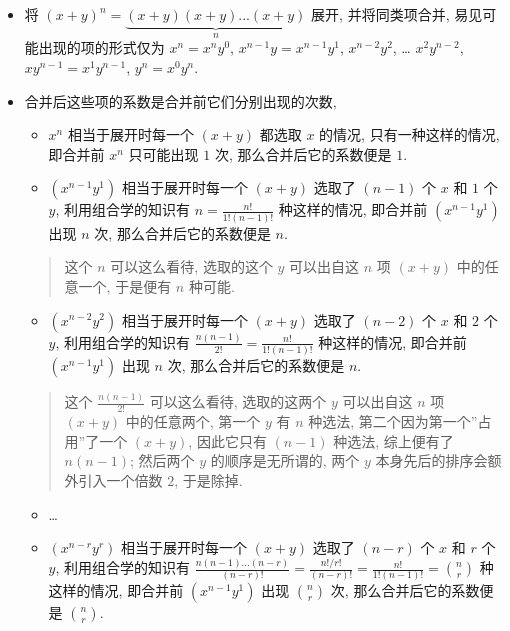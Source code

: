 \begin{itemize}
\item
  将 \((x+y)^n=\underbrace{(x+y)(x+y)...(x+y)}_{n}\) 展开,
  并将同类项合并, 易见可能出现的项的形式仅为 \(x^n=x^ny^0\),
  \(x^{n-1}y=x^{n-1}y^1\), \(x^{n-2}y^2\), \ldots{} \(x^2y^{n-2}\),
  \(xy^{n-1}=x^1y^{n-1}\), \(y^n=x^0y^n\).
\item
  合并后这些项的系数是合并前它们分别出现的次数,

  \begin{itemize}
  \tightlist
  \item
    \(x^n\) 相当于展开时每一个 \((x+y)\) 都选取 \(x\) 的情况,
    只有一种这样的情况, 即合并前 \(x^n\) 只可能出现 \(1\) 次,
    那么合并后它的系数便是 \(1\).
  \item
    \((x^{n-1}y^1)\) 相当于展开时每一个 \((x+y)\) 选取了 \((n-1)\) 个
    \(x\) 和 \(1\) 个 \(y\), 利用组合学的知识有
    \(n=\frac{n!}{1!(n-1)!}\) 种这样的情况, 即合并前 \((x^{n-1}y^1)\)
    出现 \(n\) 次, 那么合并后它的系数便是 \(n\).
  \end{itemize}

  \begin{quote}
  这个 \(n\) 可以这么看待, 选取的这个 \(y\) 可以出自这 \(n\) 项
  \((x+y)\) 中的任意一个, 于是便有 \(n\) 种可能.
  \end{quote}

  \begin{itemize}
  \tightlist
  \item
    \((x^{n-2}y^2)\) 相当于展开时每一个 \((x+y)\) 选取了 \((n-2)\) 个
    \(x\) 和 \(2\) 个 \(y\), 利用组合学的知识有
    \(\frac{n(n-1)}{2!}=\frac{n!}{1!(n-1)!}\) 种这样的情况, 即合并前
    \((x^{n-1}y^1)\) 出现 \(n\) 次, 那么合并后它的系数便是 \(n\).
  \end{itemize}

  \begin{quote}
  这个 \(\frac{n(n-1)}{2!}\) 可以这么看待, 选取的这两个 \(y\) 可以出自这
  \(n\) 项 \((x+y)\) 中的任意两个, 第一个 \(y\) 有 \(n\) 种选法,
  第二个因为第一个''占用''了一个 \((x+y)\), 因此它只有 \((n-1)\) 种选法,
  综上便有了 \(n(n-1)\); 然后两个 \(y\) 的顺序是无所谓的, 两个 \(y\)
  本身先后的排序会额外引入一个倍数 \(2\), 于是除掉.
  \end{quote}

  \begin{itemize}
  \tightlist
  \item
    \ldots{}
  \item
    \((x^{n-r}y^r)\) 相当于展开时每一个 \((x+y)\) 选取了 \((n-r)\) 个
    \(x\) 和 \(r\) 个 \(y\), 利用组合学的知识有
    \(\frac{n(n-1)...(n-r)}{(n-r)!}=\frac{n!/r!}{(n-r)!}=\frac{n!}{1!(n-1)!}=\binom{n}{r}\)
    种这样的情况, 即合并前 \((x^{n-1}y^1)\) 出现 \(\binom{n}{r}\) 次,
    那么合并后它的系数便是 \(\binom{n}{r}\).
  \end{itemize}


\end{itemize}
